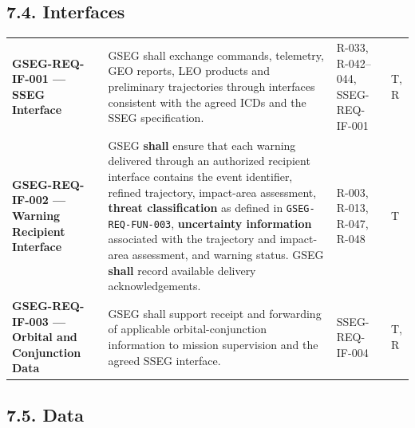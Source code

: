 \subsection{7.4. Interfaces}\label{interfaces}

\begingroup{}
\begin{longtable}{|P{0.27}|P{0.46}|P{0.16}|P{0.11}|}
\hline{}
 &  &  & \\ \hline
\endhead
\hline\endlastfoot
\textbf{GSEG-REQ-IF-001 — SSEG Interface} & GSEG shall exchange commands, telemetry, GEO reports, LEO products and preliminary trajectories through interfaces consistent with the agreed ICDs and the SSEG specification. & R-033, R-042–044, SSEG-REQ-IF-001 & T, R\\ \hline
\textbf{GSEG-REQ-IF-002 — Warning Recipient Interface} & GSEG \textbf{shall} ensure that each warning delivered through an authorized recipient interface contains the event identifier, refined trajectory, impact-area assessment, \textbf{threat classification} as defined in \texttt{GSEG-REQ-FUN-003}, \textbf{uncertainty information} associated with the trajectory and impact-area assessment, and warning status. GSEG \textbf{shall} record available delivery acknowledgements. & R-003, R-013, R-047, R-048 & T\\ \hline
\textbf{GSEG-REQ-IF-003 — Orbital and Conjunction Data} & GSEG shall support receipt and forwarding of applicable orbital-conjunction information to mission supervision and the agreed SSEG interface. & SSEG-REQ-IF-004 & T, R\\*
\end{longtable}
\endgroup

\subsection{7.5. Data}\label{data-and-retention}

